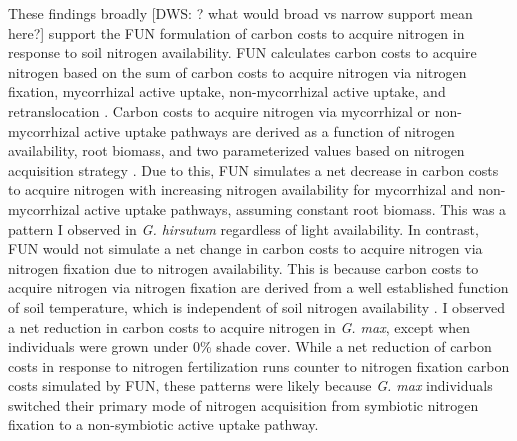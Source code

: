 These findings broadly [DWS: ? what would broad vs narrow support mean here?]  support the FUN formulation of carbon costs to acquire nitrogen in response to soil nitrogen availability. FUN calculates carbon costs to acquire nitrogen based on the sum of carbon costs to acquire nitrogen via nitrogen fixation, mycorrhizal active uptake, non-mycorrhizal active uptake, and retranslocation . Carbon costs to acquire nitrogen via mycorrhizal or non-mycorrhizal active uptake pathways are derived as a function of nitrogen availability, root biomass, and two parameterized values based on nitrogen acquisition strategy . Due to this, FUN simulates a net decrease in carbon costs to acquire nitrogen with increasing nitrogen availability for mycorrhizal and non-mycorrhizal active uptake pathways, assuming constant root biomass. This was a pattern I observed in \textit{G. hirsutum} regardless of light availability. In contrast, FUN would not simulate a net change in carbon costs to acquire nitrogen via nitrogen fixation due to nitrogen availability. This is because carbon costs to acquire nitrogen via nitrogen fixation are derived from a well established function of soil temperature, which is independent of soil nitrogen availability . I observed a net reduction in carbon costs to acquire nitrogen in \textit{G. max}, except when individuals were grown under 0\% shade cover. While a net reduction of carbon costs in response to nitrogen fertilization runs counter to nitrogen fixation carbon costs simulated by FUN, these patterns were likely because \textit{G. max} individuals switched their primary mode of nitrogen acquisition from symbiotic nitrogen fixation to a non-symbiotic active uptake pathway.

